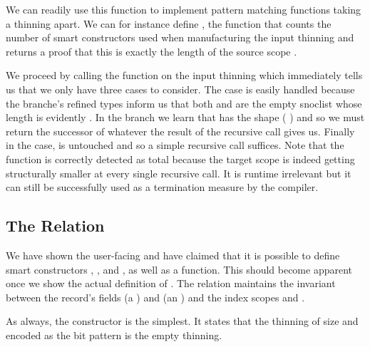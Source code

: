 
We can readily use this function to implement pattern matching functions taking
a thinning apart. We can for instance define , the function
that counts the number of  smart constructors used when
manufacturing the input thinning and returns a proof that this is exactly the
length of the source scope .


We proceed by calling the  function on the input thinning
which immediately tells us that we only have three cases to consider.
%
The  case is easily handled because the branche's refined
types inform us that both  and  are the
empty snoclist \IdrisData{[<]} whose length is evidently .
%
In the  branch we learn that  has the shape
(\IdrisBound{\KatlaUnderscore} \IdrisData{:<} ) and so we must return the
successor of whatever the result of the recursive call gives us.
%
Finally in the  case,  is untouched and so a
simple recursive call suffices.
%
Note that the function is correctly detected as total because the target scope
 is indeed getting structurally smaller at every single recursive
call.
%
It is runtime irrelevant but it can still be successfully used as a termination
measure by the compiler.

\subsection{The  Relation}

We have shown the user-facing  and have claimed that it is possible
to define smart constructors , ,
and , as well as a  function.
%
This should become apparent once we show the actual definition of .
%
The relation maintains the invariant between the record's
fields  (a )
and  (an )
and the index scopes  and .

As always, the  constructor is the simplest.
%
It states that the thinning of size  and encoded as the bit
pattern  is the empty thinning.

